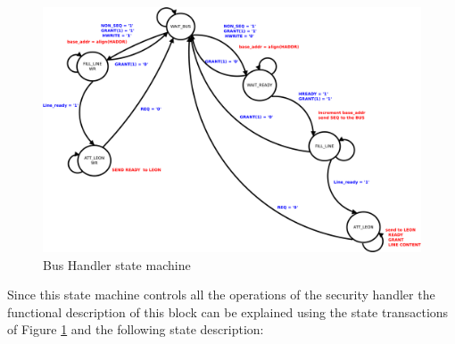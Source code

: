 \begin{figure}[!ht]
	\centering
	\includegraphics[scale=0.25]{figures/pdf/state_machine_force.pdf}
    \caption{Bus Handler state machine  }
	\label{fig:phsm}
\end{figure}
Since this  state machine controls all the operations of the security handler the functional 
description of this block can be explained using the state transactions of Figure \ref{fig:phsm} and the 
following state description:

